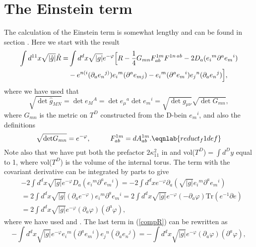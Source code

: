 \section{The Einstein term}
The calculation of the Einstein term is somewhat lengthy and can be
found in section . Here we start with the result
\begin{align}
\int d^{11}x \sqrt{|\hat{g}|} \hat{R} =& \int d^{d}x \sqrt{|g|} e^{-\varphi} \Big{[}R - {1 \over 4}G_{mn}F_{ab}^{1m}F^{1n \hspace{0.05cm} ab} - 2D_a (e{_i}^{m} \partial^ae{_m}^i) \nonumber \\
&- e^{n(i}({\partial}_a e{_n}^{j)})e{_i}^m(\partial^a e_{mj}) -e{_i}^m({\partial}^a e{_m}^i) e{_j}^n({\partial}_a e{_n}^j)\Big{]},
\label{compR}
\end{align}
where we have used that
\begin{equation}
\sqrt{\det\hat{g}_{MN}} = \det e{_M}^A = \det e{_\mu}^a\det e{_m}^i = \sqrt{\det g_{\mu \nu}} \sqrt{\det G_{mn}},
\end{equation}
where $G_{mn}$ is the metric on $T^D$ constructed from the D-bein $e{_m}^i$, and also the definitions
\begin{equation}
\sqrt{\mbox{det}G_{mn}}=e^{-\varphi}, \hspace{1cm} F_{ab}^{1m}=dA_{ab}^{1m}.
\eqnlab{reduct_f1def}
\end{equation}
Note also that we have put both the prefactor $2 {\kappa}_{11}^2$ in  and vol($T^D$)$=\int d^Dy$ equal to 1, where vol($T^D$) is the volume of the internal torus.
The term with the covariant derivative can be integrated by parts to give
\begin{align}
&-2 \int d^dx \sqrt{|g|} e^{-\varphi} D_a (e{_i}^m \partial^a e{_m}^i) = -2 \int d^dx e^{-\varphi} {\partial}_a (\sqrt{|g|}e{_i}^m \partial^a e{_m}^i) \nonumber \\
&=2\int d^dx\sqrt{|g|}({\partial}_a e^{-\varphi})e{_i}^m \partial^a e{_m}^i = 2\int d^dx \sqrt{|g|} e^{-\varphi} (-{\partial}_a \varphi)\mbox{Tr}(e^{-1}\partial e) \nonumber \\
&=2 \int d^dx \sqrt{|g|} e^{-\varphi} ({\partial}_a \varphi) ({\partial}^a \varphi),
\label{t1}
\end{align}
where we have used  and . The last term in (\ref{compR}) can be rewritten as
\begin{equation}
-\int d^dx \sqrt{|g|} e^{-\varphi}e{_i}^m({\partial}^a e{_m}^i) e{_j}^n({\partial}_a e{_n}^j) = -\int d^dx \sqrt{|g|} e^{-\varphi} ({\partial}_a \varphi) ({\partial}^a \varphi),
\label{t2}
\end{equation}
